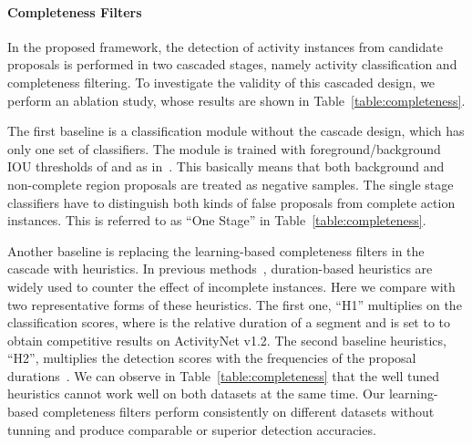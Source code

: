 \documentclass[10pt,twocolumn,letterpaper]{article}
\begin{document}
\paragraph{Completeness Filters}
In the proposed framework, the detection of activity instances from candidate proposals is performed in two cascaded stages, namely activity classification and completeness filtering.
To investigate the validity of this cascaded design, we perform an ablation study,
whose results are shown in Table~\ref{table:completeness}.

The first baseline is a classification module without the cascade design, which has only one set of classifiers.
The module is trained with foreground/background IOU thresholds of  and  as in~\cite{Shou2016SCNN}.
This basically means that both background and non-complete region proposals are treated as negative samples.
The single stage classifiers have to distinguish both kinds of false proposals from complete action instances.
This is referred to as ``One Stage'' in Table~\ref{table:completeness}.

Another baseline is replacing the learning-based completeness filters in the cascade with heuristics.
In previous methods~\cite{Shou2016SCNN,Oneata2013FV,wang2014action}, duration-based heuristics are widely used to counter the effect of incomplete instances.
Here we compare with two representative forms of these heuristics.
The first one, ``H1'' multiplies  on the classification scores, where  is the relative duration of a segment and  is set to  to obtain competitive results on ActivityNet v1.2.
The second baseline heuristics, ``H2'', multiplies the detection scores with the frequencies of the proposal durations~\cite{Shou2016SCNN}.
We can observe in Table~\ref{table:completeness} that the well tuned heuristics cannot work well on both datasets at the same time.
Our learning-based completeness filters perform consistently on different datasets without tunning and produce comparable or superior detection accuracies.
\end{document}

